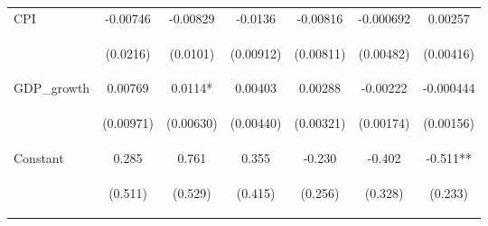 \documentclass[]{article}
\begin{document}
\begin{center}
\begin{tabular}{lcccccc}
CPI & -0.00746 & -0.00829 & -0.0136 & -0.00816 & -0.000692 & 0.00257 \\
\vspace{4pt} & \begin{footnotesize}(0.0216)\end{footnotesize} & \begin{footnotesize}(0.0101)\end{footnotesize} & \begin{footnotesize}(0.00912)\end{footnotesize} & \begin{footnotesize}(0.00811)\end{footnotesize} & \begin{footnotesize}(0.00482)\end{footnotesize} & \begin{footnotesize}(0.00416)\end{footnotesize} \\
GDP\_growth & 0.00769 & 0.0114* & 0.00403 & 0.00288 & -0.00222 & -0.000444 \\
\vspace{4pt} & \begin{footnotesize}(0.00971)\end{footnotesize} & \begin{footnotesize}(0.00630)\end{footnotesize} & \begin{footnotesize}(0.00440)\end{footnotesize} & \begin{footnotesize}(0.00321)\end{footnotesize} & \begin{footnotesize}(0.00174)\end{footnotesize} & \begin{footnotesize}(0.00156)\end{footnotesize} \\
Constant & 0.285 & 0.761 & 0.355 & -0.230 & -0.402 & -0.511** \\
 & \begin{footnotesize}(0.511)\end{footnotesize} & \begin{footnotesize}(0.529)\end{footnotesize} & \begin{footnotesize}(0.415)\end{footnotesize} & \begin{footnotesize}(0.256)\end{footnotesize} & \begin{footnotesize}(0.328)\end{footnotesize} & \begin{footnotesize}(0.233)\end{footnotesize} \\

\end{tabular}
\end{center}
\end{document}
